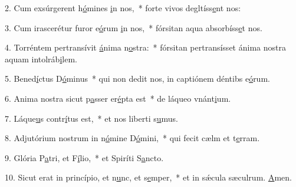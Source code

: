 2. Cum exsúrgerent h\uline{ó}mines \uline{i}n nos,~* forte vivos degltíss\uline{e}nt nos:\par 
3. Cum irascerétur furor e\uline{ó}rum \uline{i}n nos,~* fórsitan aqua absorbíss\uline{e}t nos.\par 
4. Torréntem pertransívit \uline{á}nima n\uline{o}stra:~* fórsitan pertransísset ánima nostra aquam intolráb\uline{i}lem.\par 
5. Bened\uline{í}ctus D\uline{ó}minus~* qui non dedit nos, in captiónem déntibs e\uline{ó}rum.\par 
6. Anima nostra sicut p\uline{a}sser er\uline{é}pta est~* de láqueo vnánt\uline{i}um.\par 
7. Láque\uline{u}s contr\uline{í}tus est,~* et nos liberti s\uline{u}mus.\par 
8. Adjutórium nostrum in n\uline{ó}mine D\uline{ó}mini,~* qui fecit cælm et t\uline{e}rram.\par 
9. Glória P\uline{a}tri, et F\uline{í}lio,~* et Spiríti S\uline{a}ncto.\par 
10. Sicut erat in princípio, et n\uline{u}nc, et s\uline{e}mper,~* et in sǽcula sæculrum. \uline{A}men.\par 
